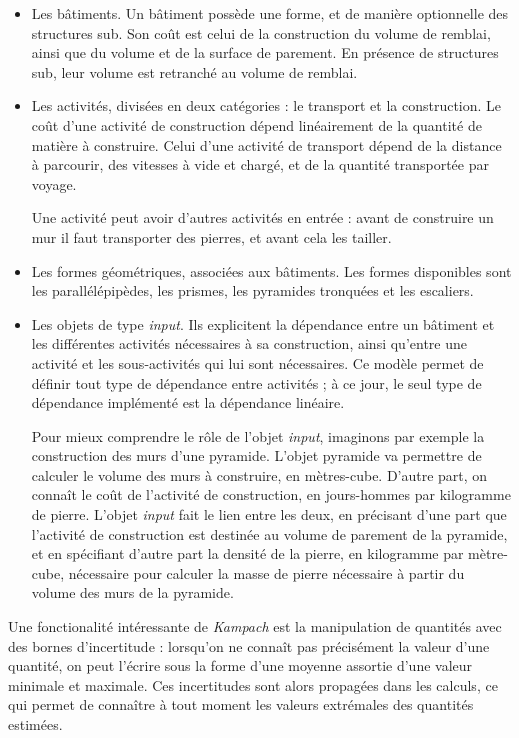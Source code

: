 \documentclass{article}
\begin{document}
\begin{itemize}
\item Les bâtiments. Un bâtiment possède une forme, et de manière optionnelle des structures sub. Son coût est celui de la construction du volume de remblai, ainsi que du volume et de la surface de parement. En présence de structures sub, leur volume est retranché au volume de remblai.

\item Les activités, divisées en deux catégories : le transport et la construction. Le coût d'une activité de construction dépend linéairement de la quantité de matière à construire. Celui d'une activité de transport dépend de la distance à parcourir, des vitesses à vide et chargé, et de la quantité transportée par voyage.

Une activité peut avoir d'autres activités en entrée : avant de construire un mur il faut transporter des pierres, et avant cela les tailler.

\item Les formes géométriques, associées aux bâtiments. Les formes disponibles sont les parallélépipèdes, les prismes, les pyramides tronquées et les escaliers.

\item Les objets de type \textit{input}. Ils explicitent la dépendance entre un bâtiment et les différentes activités nécessaires à sa construction, ainsi qu'entre une activité et les sous-activités qui lui sont nécessaires. Ce modèle permet de définir tout type de dépendance entre activités ; à ce jour, le seul type de dépendance implémenté est la dépendance linéaire.

Pour mieux comprendre le rôle de l'objet \textit{input}, imaginons par exemple la construction des murs d'une pyramide. L'objet pyramide va permettre de calculer le volume des murs à construire, en mètres-cube. D'autre part, on connaît le coût de l'activité de construction, en jours-hommes par kilogramme de pierre. L'objet \textit{input} fait le lien entre les deux, en précisant d'une part que l'activité de construction est destinée au volume de parement de la pyramide, et en spécifiant d'autre part la densité de la pierre, en kilogramme par mètre-cube, nécessaire pour calculer la masse de pierre nécessaire à partir du volume des murs de la pyramide.
\end{itemize}

Une fonctionalité intéressante de \textit{Kampach} est la manipulation de quantités avec des bornes d'incertitude : lorsqu'on ne connaît pas précisément la valeur d'une quantité, on peut l'écrire sous la forme d'une moyenne assortie d'une valeur minimale et maximale. Ces incertitudes sont alors propagées dans les calculs, ce qui permet de connaître à tout moment les valeurs extrémales des quantités estimées.
\end{document}

